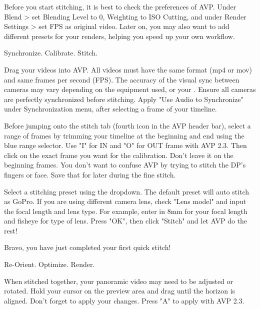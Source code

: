 \begin{fullwidth}
\tip Before you start stitching, it is best to check the preferences of AVP. Under Blend > set Blending Level to 0, Weighting to ISO Cutting, and under Render Settings > set FPS as original video. Later on, you may also want to add different presets for your renders, helping you speed up your own workflow.


{\large Synchronize. Calibrate. Stitch. \par}

Drag your videos into AVP. All videos must have the same format (mp4 or mov) and same frames per second (FPS). The accuracy of the visual sync between cameras may vary depending on the equipment used, or your \textbf{}. Ensure all cameras are perfectly synchronized before stitching. Apply "Use Audio to Synchronize" under Synchronization menu, after selecting a frame of your timeline. 


Before jumping onto the stitch tab (fourth icon in the AVP header bar), select a range of frames by trimming your timeline at the beginning and end using the blue range selector. Use "I" for IN and "O" for OUT frame with AVP 2.3. Then click on the exact frame you want for the calibration. Don't leave it on the beginning frames. You don't want to confuse AVP by trying to stitch the DP's fingers or face. Save that for later during the fine stitch. 


Select a stitching preset using the dropdown. The default preset will auto stitch as GoPro. If you are using different camera lens, check "Lens model" and input the focal length and lens type. For example, enter in 8mm for your focal length and fisheye for type of lens. Press "OK", then click "Stitch" and let AVP do the rest!


Bravo, you have just completed your first quick stitch!

{\large Re-Orient. Optimize. Render. \par}

When stitched together, your panoramic video may need to be adjusted or rotated. Hold your cursor on the preview area and drag until the horizon is aligned. Don't forget to apply your changes. Press "A" to apply with AVP 2.3.



\end{fullwidth}
